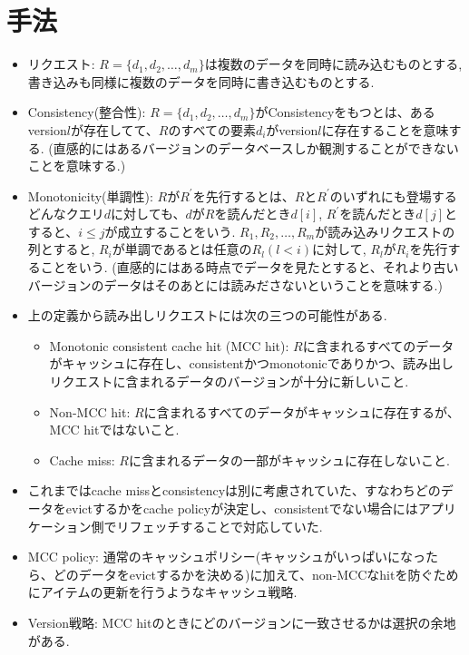 \documentclass[dvipdfmx,uplatex]{jsarticle}
\theoremstyle{remark}
\newenvironment{method}[1]{
    \begin{tcolorbox}[
        colframe=green!50!black,
        colback=green!50!black!10!white,
        colbacktitle=green!50!black!40!white,
        coltitle=black,
        fonttitle=\bfseries,
        title={#1}
    ]
}{
    \end{tcolorbox}
}
\begin{document}
\section{手法}
\begin{method}{MCC Policy}
\begin{itemize}
    \item リクエスト: $R = \{d_1, d_2, \dots, d_m\}$は複数のデータを同時に読み込むものとする, 書き込みも同様に複数のデータを同時に書き込むものとする.
    \item Consistency(整合性): $R = \{d_1, d_2, \dots, d_m\}$がConsistencyをもつとは、あるversion$l$が存在してて、$R$のすべての要素$d_i$がversion$l$に存在することを意味する. (直感的にはあるバージョンのデータベースしか観測することができないことを意味する.)
    \item Monotonicity(単調性): $R$が$R^\prime$を先行するとは、$R$と$R^\prime$のいずれにも登場するどんなクエリ$d$に対しても、$d$が$R$を読んだとき$d[i]$, $R^\prime$を読んだとき$d[j]$とすると、$i \leq j$が成立することをいう. $R_1, R_2, \dots, R_m$が読み込みリクエストの列とすると, $R_i$が単調であるとは任意の$R_l (l < i)$に対して, $R_l$が$R_i$を先行することをいう. (直感的にはある時点でデータを見たとすると、それより古いバージョンのデータはそのあとには読みださないということを意味する.)
    \item 上の定義から読み出しリクエストには次の三つの可能性がある.
    \begin{itemize}
        \item Monotonic consistent cache hit (MCC hit): $R$に含まれるすべてのデータがキャッシュに存在し、consistentかつmonotonicでありかつ、読み出しリクエストに含まれるデータのバージョンが十分に新しいこと.
        \item Non-MCC hit: $R$に含まれるすべてのデータがキャッシュに存在するが、MCC hitではないこと.
        \item Cache miss: $R$に含まれるデータの一部がキャッシュに存在しないこと.
    \end{itemize}
    \item これまではcache missとconsistencyは別に考慮されていた、すなわちどのデータをevictするかをcache policyが決定し、consistentでない場合にはアプリケーション側でリフェッチすることで対応していた.
    \item MCC policy: 通常のキャッシュポリシー(キャッシュがいっぱいになったら、どのデータをevictするかを決める)に加えて、non-MCCなhitを防ぐためにアイテムの更新を行うようなキャッシュ戦略.
    \item Version戦略: MCC hitのときにどのバージョンに一致させるかは選択の余地がある.

\end{itemize}
\end{method}
\end{document}
